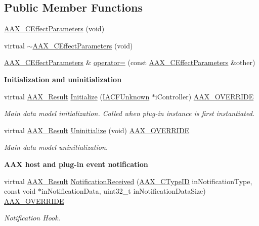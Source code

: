 \subsection*{Public Member Functions}
\begin{DoxyCompactItemize}
\item 
\hyperlink{a00018_a35be0a247836ce95e3c6d04a3d756a9f}{A\+A\+X\+\_\+\+C\+Effect\+Parameters} (void)
\item 
virtual \hyperlink{a00018_a9cf56e3654a429ed41bb0653d181109f}{$\sim$\+A\+A\+X\+\_\+\+C\+Effect\+Parameters} (void)
\item 
\hyperlink{a00018}{A\+A\+X\+\_\+\+C\+Effect\+Parameters} \& \hyperlink{a00018_aea47eeb638da0d670fb92d3f1e0f9419}{operator=} (const \hyperlink{a00018}{A\+A\+X\+\_\+\+C\+Effect\+Parameters} \&other)
\end{DoxyCompactItemize}
\begin{Indent}{\bf Initialization and uninitialization}\par
\begin{DoxyCompactItemize}
\item 
virtual \hyperlink{a00149_a4d8f69a697df7f70c3a8e9b8ee130d2f}{A\+A\+X\+\_\+\+Result} \hyperlink{a00018_ac36930c5177d982a30164c0b0477d012}{Initialize} (\hyperlink{a00146}{I\+A\+C\+F\+Unknown} $\ast$i\+Controller) \hyperlink{a00149_ac2f24a5172689ae684344abdcce55463}{A\+A\+X\+\_\+\+O\+V\+E\+R\+R\+I\+D\+E}
\begin{DoxyCompactList}\small\item\em Main data model initialization. Called when plug-\/in instance is first instantiated. \end{DoxyCompactList}\item 
virtual \hyperlink{a00149_a4d8f69a697df7f70c3a8e9b8ee130d2f}{A\+A\+X\+\_\+\+Result} \hyperlink{a00018_a378252f43a26158950ee04fc41c11b1c}{Uninitialize} (void) \hyperlink{a00149_ac2f24a5172689ae684344abdcce55463}{A\+A\+X\+\_\+\+O\+V\+E\+R\+R\+I\+D\+E}
\begin{DoxyCompactList}\small\item\em Main data model uninitialization. \end{DoxyCompactList}\end{DoxyCompactItemize}
\end{Indent}
\begin{Indent}{\bf A\+A\+X host and plug-\/in event notification}\par
\begin{DoxyCompactItemize}
\item 
virtual \hyperlink{a00149_a4d8f69a697df7f70c3a8e9b8ee130d2f}{A\+A\+X\+\_\+\+Result} \hyperlink{a00018_a696fb53ee9a3943e6bd1e2b3601eac02}{Notification\+Received} (\hyperlink{a00149_ac678f9c1fbcc26315d209f71a147a175}{A\+A\+X\+\_\+\+C\+Type\+I\+D} in\+Notification\+Type, const void $\ast$in\+Notification\+Data, uint32\+\_\+t in\+Notification\+Data\+Size) \hyperlink{a00149_ac2f24a5172689ae684344abdcce55463}{A\+A\+X\+\_\+\+O\+V\+E\+R\+R\+I\+D\+E}
\begin{DoxyCompactList}\small\item\em Notification Hook. \end{DoxyCompactList}\end{DoxyCompactItemize}
\end{Indent}
